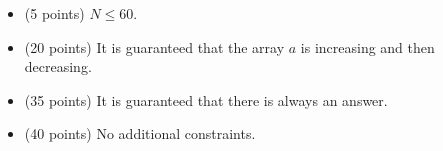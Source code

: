 \documentclass[12pt]{scrartcl}
\begin{document}


    \begin{itemize}
        \item (5 points) $N \le 60$.
        \item (20 points) It is guaranteed that the array $a$ is increasing and then decreasing.
        \item (35 points) It is guaranteed that there is always an answer.
        \item (40 points) No additional constraints.
    \end{itemize}
\end{document}
